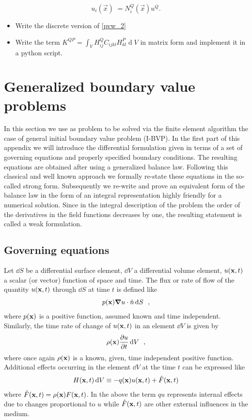 \[ u_i(\overrightarrow x)\;=N_i^Q(\overrightarrow x)u^Q.\]

\begin{itemize}
\item Write the discrete version of \cref{pvw_2}
\item Write the term $K^{QP} = \int_VH_{ij}^QC_{ijkl}H_{kl}^P\operatorname dV$ in matrix form and implement it in a python script.
\end{itemize}

\newpage

\chapter{Generalized boundary value problems}
In this section we use as problem to be solved via the finite element algorithm the case of general initial boundary value problem (I-BVP). In the first part of this appendix we will introduce the differential formulation given in terms of a set of governing equations and properly specified boundary conditions. The resulting equations are obtained after using a generalized balance law. Following this classical and well known approach we formally re-state these equations in the so-called strong form. Subsequently we re-write and prove an equivalent form of the balance law in the form of an integral representation highly friendly for a numerical solution. Since in the integral description of the problem the order of the derivatives in the field functions decreases by one, the resulting statement is called a weak formulation. 

\section{Governing equations}
Let $\dd{S}$ be a differential surface element, $\dd{V}$ a differential volume element, $u(\vb{x},t)$ a scalar (or vector) function of space and time. The flux or rate of flow of the quantity $u(\vb x, t)$ through $\dd{S}$ at time $t$ is defined like
\[p(\vb x)\grad u \cdot \hat n \dd{S} \enspace ,\]
where $p(\vb x)$ is a positive function, assumed known and time independent. Similarly, the time rate of change of $u(\vb x, t)$ in an element $\dd{V}$ is given by
\[\rho (\vb x)\pdv{u}{t} \dd{V} \enspace ,\]
where once again $\rho (\vb x)$ is a known, given, time independent positive function. Additional effects occurring in the element $\dd{V}$ at the time $t$ can be expressed like
\[H(\vb x, t)\dd{V} \equiv  - q(\vb x)u(\vb x, t) + \hat F(\vb x,t)\]
where $\hat F(\vb x, t) = \rho (\vb x)F(\vb x, t)$. In the above the term $q u$ represents internal effects due to changes proportional to $u$ while $\hat F(\vb x, t)$ are other external influences in the medium.

